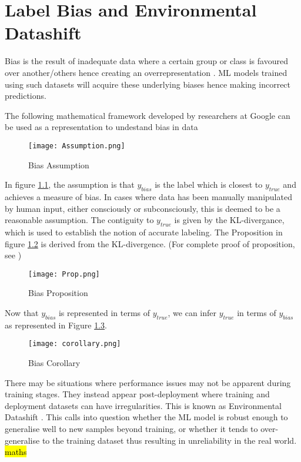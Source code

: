 \chapter{Label Bias and Environmental Datashift}
Bias is the result of inadequate data where a certain group or class is favoured over another/others hence creating an overrepresentation \cite{Jiang}\cite{saria2019tutorial}.
ML models trained using such datasets will acquire these underlying biases hence making incorrect predictions.

The following mathematical framework developed by researchers at Google can be used as a representation to undestand bias in data \cite{Jiang}

\begin{figure}[h]
    \texttt{[image: Assumption.png]}
    \centering
    \caption{Bias Assumption \cite{Jiang}}
    \label{fig:Assumption}
\end{figure}

In figure \ref{fig:Assumption}, the assumption is that $y_{bias}$ is the label which is closest to $y_{true}$ and achieves a measure of bias.
In cases where data has been manually manipulated by human input, either consciously or subconsciously, this is deemed to be a reasonable assumption.
The contiguity to $y_{true}$ is given by the KL-divergance, which is used to establish the notion of accurate labeling. 
The Proposition in figure \ref{fig:Proposition} is derived from the KL-divergence. (For complete proof of proposition, see \cite{Jiang})

\begin{figure}[h]
    \texttt{[image: Prop.png]}
    \centering
    \caption{Bias Proposition \cite{Jiang}}
    \label{fig:Proposition}
\end{figure}

Now that $y_{bias}$ is represented in terms of $y_{true}$, we can infer $y_{true}$ in terms of $y_{bias}$ as represented in Figure \ref{fig:Corollary}.

\begin{figure}[h]
    \texttt{[image: corollary.png]}
    \centering
    \caption{Bias Corollary \cite{Jiang}}
    \label{fig:Corollary}
\end{figure}

There may be situations where performance issues may not be apparent during training stages. 
They instead appear post-deployment where training and deployment datasets can have irregularities. 
This is known as Environmental Datashift \cite{saria2019tutorial}. 
This calls into question whether the ML model is robust enough to generalise well to new samples beyond training, or whether it tends to over-generalise to the training dataset thus resulting in unreliability in the real world.
\hl{maths}

